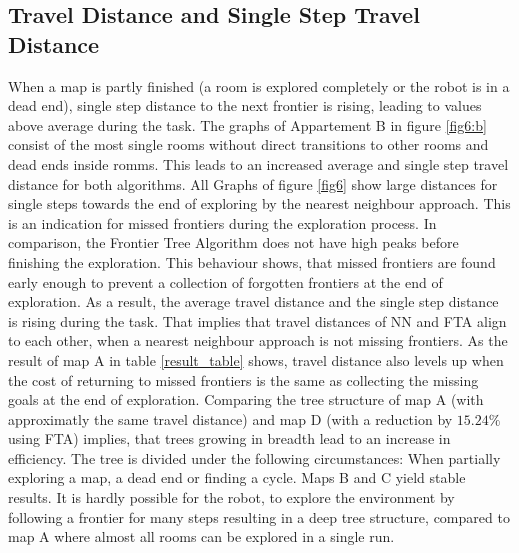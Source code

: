 \documentclass[twocolumn]{svjour3}[2016]
\begin{document}
\subsection{Travel Distance and Single Step Travel Distance}
When a map is partly finished (a room is explored completely or the robot is in a dead end), single step distance to the next frontier is rising, leading to values above average during the task. The graphs of Appartement B in figure \ref{fig6:b} consist of the most single rooms without direct transitions to other rooms and dead ends inside romms. This leads to an increased average and single step travel distance for both algorithms. All Graphs of figure \ref{fig6} show large distances for single steps towards the end of exploring by the nearest neighbour approach. This is an indication for missed frontiers during the exploration process. In comparison, the Frontier Tree Algorithm does not have high peaks before finishing the exploration. This behaviour shows, that missed frontiers are found early enough to prevent a collection of forgotten frontiers at the end of exploration. As a result, the average travel distance and the single step distance is rising during the task. That implies that travel distances of NN and FTA align to each other, when a nearest neighbour approach is not missing frontiers. As the result of map A in table \ref{result_table} shows, travel distance also levels up when the cost of returning to missed frontiers is the same as collecting the missing goals at the end of exploration. Comparing the tree structure of map A (with approximatly the same travel distance) and map D (with a reduction by $15.24\%$ using FTA) implies, that trees growing in breadth lead to an increase in efficiency. The tree is divided under the following circumstances: When partially exploring a map, a dead end or finding a cycle.
Maps B and C yield stable results. It is hardly possible for the robot, to explore the environment by following a frontier for many steps resulting in a deep tree structure, compared to map A where almost all rooms can be explored in a single run.
\end{document}
